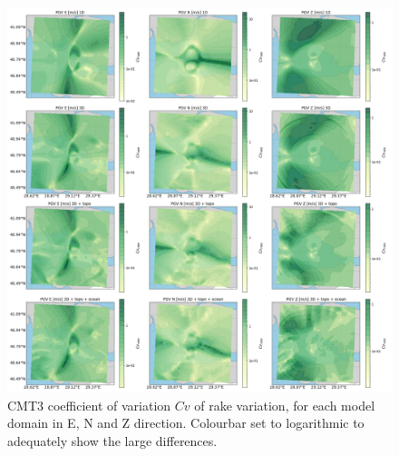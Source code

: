 \documentclass[../Text/00main.tex]{subfiles}
\begin{document}
\begin{figure}[!h]
    \centering
    \includegraphics[width=1\linewidth]{images_results/rake_variation_sigma_sc4.png}
    \caption{CMT3 coefficient of variation $Cv$ of rake variation, for each model domain in E, N and Z direction. Colourbar set to logarithmic to adequately show the large differences.}
    \label{fig:cmt3sigm}
\end{figure}

\FloatBarrier
\end{document}
